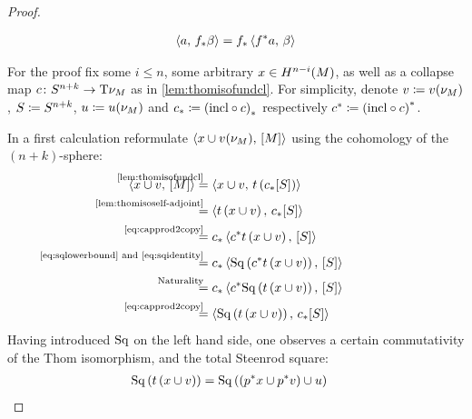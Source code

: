 \begin{Thm}
\begin{proof}
\begin{description}
      \begin{gather}\label{eq:capprod2copy}
        \left\langle a,\, {f}_* \beta \right\rangle = {f}_* \left\langle {f}^* a,\, \beta \right\rangle
      \end{gather}
    \end{description}
    For the proof fix some $i\leq n$, some arbitrary $x\in
    H^{n-i}(M)$, as well as a collapse map
    $c\colon S^{n+k}\to\mathrm{T}{\nu_{M}}$ as in
    \autoref{lem:thomisofundcl}.
    For simplicity, denote
    $v\coloneqq {v_{}}(\nu_{M})$,
    $S\coloneqq S^{n+k}$,
    $u\coloneqq {u}(\nu_{M})$ and
    ${c}_*\coloneqq {(\mathrm{incl}\circ c)}_*$
    respectively
    ${c}^*\coloneqq {(\mathrm{incl}\circ c)}^*$.
    
    
    In a first calculation reformulate
    $\left\langle x\cup {v_{}}(\nu_{M}),\, [M] \right\rangle$ using the cohomology of the
    $(n+k)$-sphere:
    \begin{align}\notag
      \capped{x\cup \vu}{\fundcl M}
      &\equalsby{\autoref{lem:thomisofundcl}}
        \capped
        {x\cup\vu}
        {\thomiso\left(\pf\collapse\fundcl{\Sph}\right)}
      \\\notag
      &\equalsby{\autoref{lem:thomisoself-adjoint}}
        \capped
        {\thomiso\left(x\cup\vu\right)}
        {\pf\collapse\fundcl{\Sph}}
      \\\notag
      &\equalsby{\eqref{eq:capprod2copy}}
        \pf\collapse\capped
        {\pb\collapse\thomiso\left(x\cup\vu\right)}
        {\fundcl{\Sph}}
      \\\notag
      &\equalsby{\eqref{eq:sqlowerbound} and \eqref{eq:sqidentity}}
        \pf\collapse\capped
        {\SQ\left(\pb\collapse\thomiso\left(x\cup\vu\right)\right)}
        {\fundcl{\Sph}}
      \\\notag
      &\equalsby{Naturality}
        \pf\collapse\capped
        {\pb\collapse\SQ\left(\thomiso\left(x\cup\vu\right)\right)}
        {\fundcl{\Sph}}
      \\\label{eq:proofaltdefwuclasses:eq1}
      &\equalsby{\eqref{eq:capprod2copy}}
        \capped
        {\SQ\left(\thomiso\left(x\cup\vu\right)\right)}
        {\pf\collapse\fundcl{\Sph}}
    \end{align}
    Having introduced $\mathrm{Sq}$ on the left hand side, one observes a
    certain commutativity of the Thom isomorphism, and the total
    Steenrod square:
    \begin{align}\notag
      \SQ\left(\thomiso\left(x\cup\vu\right)\right)
      &=
        \SQ\left(\left(\pb p x\cup \pb p\vu\right) \cup \U\right)

\end{align}
\end{proof}
\end{Thm}
